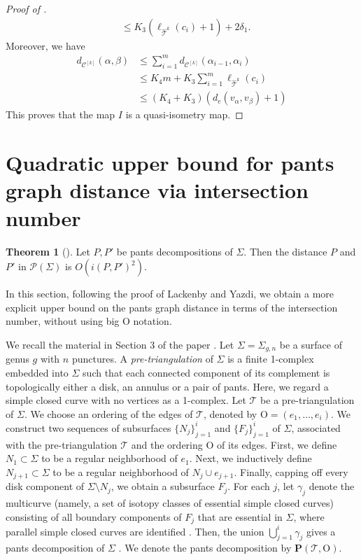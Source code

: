 \documentclass[a4paper,11pt]{amsart}
\numberwithin{equation}{section}
\theoremstyle{definition}
\newtheorem{theorem}{Theorem}[section]
\newcommand{\elTeich}{\hat{\mathcal{T}}}
\newcommand{\multicurve}[1]{\mathcal{C}^{[#1]}}
\begin{document}
\begin{proof}[Proof of ]
\begin{align*}
        &\leq K_3(\ell_{\elTeich^k}(c_i)+1)+2\delta_1.
    \end{align*}
    Moreover, we have 
    \begin{align*}
        d_{\multicurve{k}}(\alpha,\beta) &\leq \sum_{i=1}^m d_{\multicurve{k}}(\alpha_{i-1},\alpha_i) \\
        &\leq K_4 m+K_3\sum_{i=1}^m \ell_{\elTeich^k}(c_i)\\
        &\leq (K_4+K_3)(d_e(v_\alpha,v_\beta)+1)
    \end{align*}
    This proves that the map $I$ is a quasi-isometry map.
\end{proof}



\appendix
\section{Quadratic upper bound for pants graph distance via intersection number}\label{section:Appendix}

\begin{theorem}[{\cite[Corollary 3.21]{lackenby2024bounds}}]\label{theorem:QuadraticUpperBoundsForPantsGraphDistance}
    Let $P,P'$ be pants decompositions of $\Sigma$.
    Then the distance $P$ and $P'$ in $\mathcal{P}(\Sigma)$ is $O(i(P,P')^2)$.
\end{theorem}

In this section, following the proof of Lackenby and Yazdi, we obtain a more explicit upper bound on the pants graph distance in terms of the intersection number, without using big O notation.

We recall the material in Section 3 of the paper \cite{lackenby2024bounds}.
Let $\Sigma=\Sigma_{g,n}$ be a surface of genus $g$ with $n$ punctures.
A \textit{pre-triangulation} of $\Sigma$ is a finite 1-complex embedded into $\Sigma$ such that each connected component of its complement is topologically either a disk, an annulus or a pair of pants.
Here, we regard a simple closed curve with no vertices as a 1-complex.
Let $\mathcal{T}$ be a pre-triangulation of $\Sigma$.
We choose an ordering of the edges of $\mathcal{T}$, denoted by $\mathrm{O}=(e_1,\ldots,e_i)$.
We construct two sequences of subsurfaces $\{N_j\}_{j=1}^i$ and $\{F_j\}_{j=1}^i$  of $\Sigma$, associated with the pre-triangulation $\mathcal{T}$ and the ordering $\mathrm{O}$ of its edges.
First, we define $N_1\subset \Sigma$ to be a regular neighborhood of $e_1$.
Next, we inductively define $N_{j+1}\subset \Sigma$ to be a regular neighborhood of $N_j\cup e_{j+1}$.
Finally, capping off every disk component of $\Sigma\setminus N_j$, we obtain a subsurface $F_j$.
For each $j$, let $\gamma_j$ denote the multicurve (namely, a set of isotopy classes of essential simple closed curves) consisting of all boundary components of $F_j$ that are essential in $\Sigma$, where parallel simple closed curves are identified \cite[Construction 3.10]{lackenby2024bounds}.
Then, the union $\bigcup_{j=1}^i \gamma_j$ gives a pants decomposition of $\Sigma$ \cite[Lemma 3.13]{lackenby2024bounds}.
We denote the pants decomposition by $\mathbf{P}(\mathcal{T},\mathrm{O})$.
\end{document}
